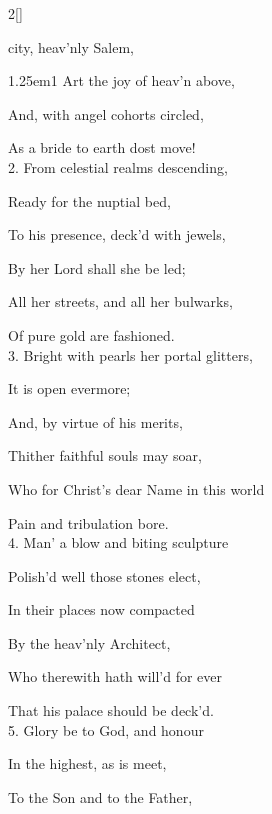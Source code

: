 \begin{paracol}{2}[]
\sloppy

\firstEvensong


\firstEvensongHymn\label{DedicationEvensong}

 city, heav'nly Salem,



\begin{hangparas}{1.25em}{1}
Art the joy of heav'n above,

And, with angel cohorts circled,

As a bride to earth dost move!\\

2. From celestial realms descending,

Ready for the nuptial bed,

To his presence, deck'd with jewels,

By her Lord shall she be led;

All her streets, and all her bulwarks,

Of pure gold are fashioned.\\

3. Bright with pearls her portal glitters,

It is open evermore;

And, by virtue of his merits,

Thither faithful souls may soar,

Who for Christ's dear Name in this world

Pain and tribulation bore.\\

4. Man' a blow and biting sculpture

Polish'd well those stones elect,

In their places now compacted

By the heav'nly Architect,

Who therewith hath will'd for ever

That his palace should be deck'd.\\

5. Glory be to God, and honour

In the highest, as is meet,

To the Son and to the Father,


\end{hangparas}
\end{paracol}
